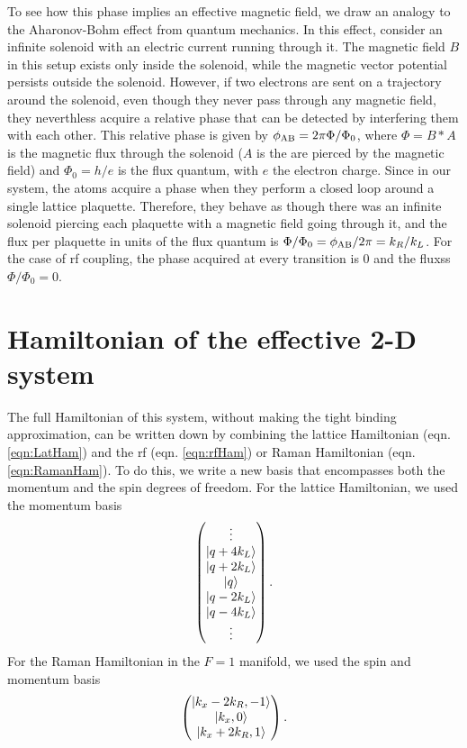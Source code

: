 To see how this phase implies an effective magnetic field, we draw an analogy to the Aharonov-Bohm effect\cite{Aharonov1959, Aharonov1992} from quantum mechanics. In this effect, consider an infinite solenoid with an electric current running through it. The magnetic field $B$ in this setup exists only inside the solenoid, while the magnetic vector potential persists outside the solenoid.  However, if two electrons are sent on a trajectory around the solenoid, even though they never pass through any magnetic field, they neverthless acquire a relative phase that can be detected by interfering them with each other. This relative phase is given by $\phi_{\rm AB} =2 \pi \Phi/\Phi_0$, where $\Phi = B*A$ is the magnetic flux through the solenoid ($A$ is the are pierced by the magnetic field) and $\Phi_0=h/e$ is the flux quantum, with $e$ the electron charge. Since in our system, the atoms acquire a phase when they perform a closed loop around a single lattice plaquette. Therefore, they behave as though there was an infinite solenoid piercing each plaquette with a magnetic field going through it, and the flux per plaquette in units of the flux quantum is $\Phi/\Phi_0=\phi_{\rm AB}/2\pi =  k_R/k_L$. For the case of rf coupling, the phase acquired at every transition is $0$ and the fluxss $\Phi/\Phi_0=0$.

\section{Hamiltonian of the effective 2-D system}

The full Hamiltonian of this system, without making the tight binding approximation, can be written down by combining the lattice Hamiltonian (eqn. \ref{eqn:LatHam}) and the rf (eqn. \ref{eqn:rfHam}) or Raman Hamiltonian (eqn. \ref{eqn:RamanHam}). To do this, we write a new basis that encompasses both the momentum and the spin degrees of freedom. For the lattice Hamiltonian, we used the momentum basis
\begin{equation}
 \begin{pmatrix} \vdots \\
\mathinner{|{q+4 k_L}\rangle}\\
\mathinner{|{q+2 k_L}\rangle}\\
\mathinner{|{q}\rangle}\\
\mathinner{|{q -2 k_L}\rangle}\\
\mathinner{|{q - 4 k_L}\rangle}\\
\vdots
\end{pmatrix} \\.
\end{equation}
For the Raman Hamiltonian in the $F=1$ manifold, we used the spin and momentum basis
\begin{equation}
\begin{pmatrix}
\mathinner{|{k_x-2k_R,-1}\rangle}\\
 \mathinner{|{k_x,0}\rangle}\\
\mathinner{|{k_x+2k_R,1}\rangle}
\end{pmatrix}\\.
\end{equation}

